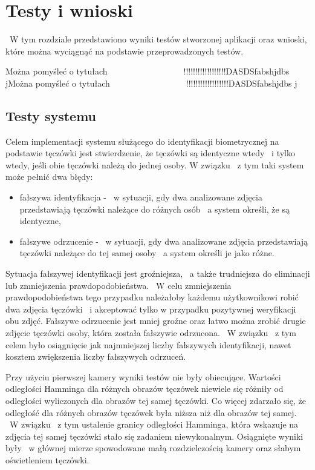 \chapter{Testy i wnioski}
\label{cha:testywnioski}
~W tym rozdziale przedstawiono wyniki testów stworzonej aplikacji oraz wnioski, które można wyciągnąć na podstawie przeprowadzonych testów.

Można pomyśleć o tytułach~~~~~~~~~~~~~~~~~~!!!!!!!!!!!!!!!!!!DASDSfabshjdbs jMożna pomyśleć o tytułach~~~~~~~~~~~~~~~~~~!!!!!!!!!!!!!!!!!!DASDSfabshjdbs j

\section{Testy systemu}
\label{sec:testy}
Celem implementacji systemu służącego do identyfikacji biometrycznej na podstawie tęczówki jest stwierdzenie, że tęczówki są identyczne wtedy ~i tylko wtedy, jeśli obie tęczówki należą do jednej osoby. W związku ~z tym taki system może pełnić dwa błędy:
\begin{itemize}
\item fałszywa identyfikacja - ~w sytuacji, gdy dwa analizowane zdjęcia przedstawiają tęczówki należące do różnych osób ~a system określi, że są identyczne,
\item fałszywe odrzucenie - ~w sytuacji, gdy dwa analizowane zdjęcia przedstawiają tęczówki należące do tej samej osoby ~a system określi je jako różne.
\end{itemize}
Sytuacja fałszywej identyfikacji jest groźniejsza, ~a także trudniejsza do eliminacji lub zmniejszenia prawdopodobieństwa. ~W celu zmniejszenia prawdopodobieństwa tego przypadku należałoby każdemu użytkownikowi robić dwa zdjęcia tęczówki ~i akceptować tylko w przypadku pozytywnej weryfikacji obu zdjęć. Fałszywe odrzucenie jest mniej groźne oraz łatwo można zrobić drugie zdjęcie tęczówki osoby, która została fałszywie odrzucona. ~W związku ~z tym celem było osiągnięcie jak najmniejszej liczby fałszywych identyfikacji, nawet kosztem zwiększenia liczby fałszywych odrzuceń.

Przy użyciu pierwszej kamery wyniki testów nie były obiecujące. Wartości odległości Hamminga dla różnych obrazów tęczówek niewiele się różniły od odległości wyliczonych dla obrazów tej samej tęczówki. Co więcej zdarzało się, że odległość dla różnych obrazów tęczówek była niższa niż dla obrazów tej samej. ~W związku ~z tym ustalenie granicy odległości Hamminga, która wskazuje na zdjęcia tej samej tęczówki stało się zadaniem niewykonalnym. Osiągnięte wyniki były ~w głównej mierze spowodowane małą rozdzielczością kamery oraz słabym oświetleniem tęczówki.

